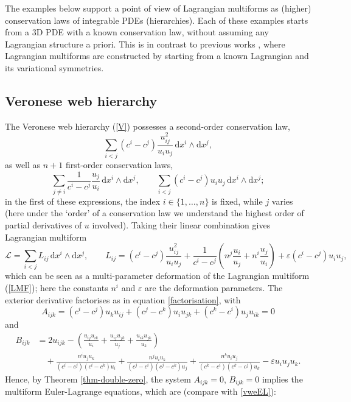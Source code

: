 \documentclass[12pt, a4paper]{article}
\theoremstyle{definition}
\renewcommand{\d}{\mathrm{d}}
\newcommand{\cL}{\mathcal{L}}
\begin{document}
The examples below support a point of view of Lagrangian multiforms as (higher) conservation laws of integrable PDEs (hierarchies).	Each of these examples starts from a 3D PDE with a known conservation law, without assuming any Lagrangian structure a priori. This is in contrast to previous works \cite{petrera2017variational,petrera2021variational,sleigh2020variational}, where Lagrangian multiforms are constructed by starting from a known Lagrangian and its variational symmetries.

\subsection{Veronese web hierarchy }

The Veronese web hierarchy (\ref{V}) possesses a second-order conservation law,
$$
\sum_{i<j}(c^i-c^j)\frac{u_{ij}^2}{u_iu_j}\, \d x^i\wedge \d x^j,
$$
as well as $n+1$ first-order conservation laws,
$$
\sum_{j\ne i}\frac{1}{c^i-c^j}\frac{u_j}{u_i}\, \d x^i\wedge \d x^j, \qquad \sum_{i< j}(c^i-c^j)u_iu_j\, \d x^i\wedge \d x^j ;
$$
in the first of these expressions, the index $i\in \{1, \dots, n\}$ is fixed, while $j$ varies (here under the `order' of a conservation law we understand the highest order of partial derivatives of $u$ involved). Taking their linear combination gives Lagrangian multiform
$$
\cL = \sum_{i < j} L_{ij}\, \d x^i\wedge \d x^j, \qquad L_{ij}=(c^i-c^j)\frac{u_{ij}^2}{u_iu_j}+\frac{1}{c^i-c^j}\left(n^j\frac{u_i}{u_j}+n^i\frac{u_j}{u_i} \right)+\varepsilon (c^i-c^j)u_iu_j,
$$
which can be seen as a multi-parameter deformation of the Lagrangian multiform (\ref{LMF}); here the constants $n^i$ and $ \varepsilon$ are the deformation parameters. The exterior derivative factorises as in equation \eqref{factorisation}, with
\[ A_{ijk} = (c^i-c^j)u_{k}u_{ij}+(c^j-c^k)u_{i}u_{jk}+(c^k-c^i)u_{j}u_{ik}=0 \]
and
\begin{align*}
	B_{ijk} &= 2 u_{ijk} - \left(\frac{u_{ij}u_{ik}}{u_i}+ \frac{u_{ij}u_{jk}}{u_j}+\frac{u_{ik}u_{jk}}{u_k}\right)\\
	&\quad + \frac{n^i u_ju_k}{(c^i-c^j)(c^i-c^k)u_i} +  \frac{n^j u_iu_k}{(c^j-c^i)(c^j-c^k)u_j} + \frac{n^k u_iu_j}{(c^k-c^i)(c^k-c^j)u_k} - \varepsilon u_iu_ju_k.
\end{align*}
Hence, by Theorem \ref{thm-double-zero}, the system $A_{ijk} = 0$, $B_{ijk} = 0$ implies the  multiform Euler-Lagrange equations, which are (compare with \eqref{vweEL}):
\end{document}
